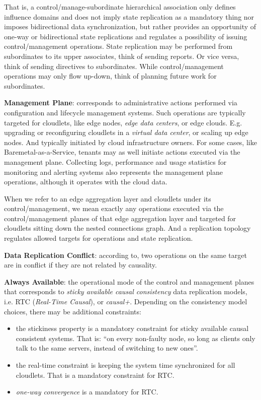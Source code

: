 \documentclass[conference]{IEEEtran}
\begin{document}
That is, a control/manage-subordinate hierarchical association only defines
influence domains and does not imply state replication as a mandatory thing nor
imposes bidirectional data synchronization, but rather provides an opportunity
of one-way or bidirectional state replications and regulates a possibility of
issuing control/management operations. State replication may be performed from
subordinates to its upper associates, think of sending reports. Or vice versa,
think of sending directives to subordinates. While control/management
operations may only flow up-down, think of planning future work for
subordinates.

\textbf{Management Plane}: corresponds to administrative actions performed via
configuration and lifecycle management systems. Such operations are typically
targeted for cloudlets, like edge nodes, \textit{edge data centers}\cite{b3},
or edge clouds. E.g. upgrading or reconfiguring cloudlets in a \textit{virtual
data center}\cite{b3}, or scaling up edge nodes. And typically initiated by
cloud infrastructure owners. For some cases, like Baremetal-as-a-Service,
tenants may as well initiate actions executed via the management plane.
Collecting logs, performance and usage statistics for monitoring and alerting
systems also represents the management plane operations, although it operates
with the cloud data.

When we refer to an edge aggregation layer and cloudlets under its
control/management, we mean exactly any operations executed via the
control/management planes of that edge aggregation layer and targeted for
cloudlets sitting down the nested connections graph. And a replication topology
regulates allowed targets for operations and state replication.

\textbf{Data Replication Conflict}: according to\cite{b1}, two operations on
the same target are in conflict if they are not related by causality.

\textbf{Always Available}: the operational mode of the control and management
planes that corresponds to \textit{sticky available causal
consistency}\cite{b4} data replication models, i.e. RTC (\textit{Real-Time
Causal}\cite{b2}), or \textit{causal+}\cite{b1}. Depending on the consistency
model choices, there may be additional constraints:

\begin{itemize}
  \item the stickiness property is a mandatory constraint for sticky available
    causal consistent systems. That is: ``on every non-faulty node, so long
    as clients only talk to the same servers, instead of switching to new
    ones''\cite{b4}.

  \item the real-time constraint is keeping the system time synchronized for
    all cloudlets. That is a mandatory constraint for RTC.

  \item \textit{one-way convergence}\cite{b2} is a mandatory for RTC.
\end{itemize}
\end{document}
